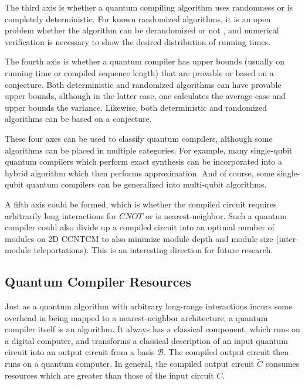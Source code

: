 The third axis is whether a quantum compiling algorithm uses randomness
or is completely deterministic. For known randomized algorithms, it is
an open problem whether the algorithm can be derandomized or not
\cite{Kliuchnikov2012}, and numerical verification is necessary to
show the desired distribution of running times.

The fourth axis is whether a quantum compiler has upper bounds
(usually on running time or compiled sequence length) that are provable or
based on a conjecture. Both deterministic and randomized
algorithms can have provable upper bounds, although
in the latter case, one calculates the average-case and upper bounds the
variance. Likewise, both deterministic and randomized algorithms can
be based on a conjecture.

These four axes can be used to classify quantum compilers, although some
algorithms can be placed in multiple categories. For example, many
single-qubit quantum compilers which perform exact synthesis can be
incorporated into a hybrid algorithm which then performs
approximation. And of course, some single-qubit quantum compilers can be generalized
into multi-qubit algorithms.

A fifth axis could be formed, which is whether the compiled circuit requires
arbitrarily long interactions for $CNOT$ or is nearest-neighbor. Such a
quantum compiler could also divide up a compiled circuit into an optimal
number of modules on \textsf{2D CCNTCM} to also minimize module depth and
module size (inter-module teleportations). This is an interesting direction
for future research.

\subsection{Quantum Compiler Resources}

Just as a quantum algorithm with arbitrary long-range interactions incurs
some overhead in being mapped to a nearest-neighbor architecture,
a quantum compiler itself is an algorithm. It always has a classical
component, which runs on a digital computer, and transforms a classical
description of an input quantum circuit into an output circuit from
a basis $\mathcal{B}$. The compiled output circuit then runs on a
quantum computer. In general, the compiled output circuit $\tilde{C}$ consumes
resources which are greater than those of the input circuit $C$.

